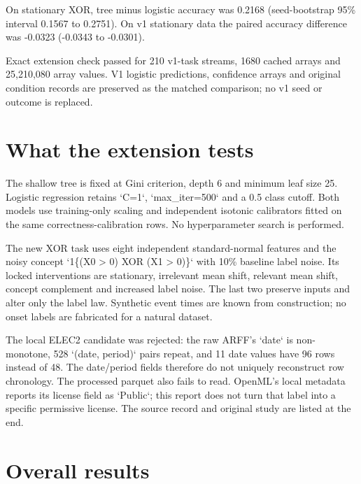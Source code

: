 \documentclass[11pt,a4paper]{article}
\begin{document}
On stationary XOR, tree minus logistic accuracy was 0.2168 (seed-bootstrap 95\% interval 0.1567 to 0.2751). On v1 stationary data the paired accuracy difference was -0.0323 (-0.0343 to -0.0301).\par

Exact extension check passed for 210 v1-task streams, 1680 cached arrays and 25,210,080 array values. V1 logistic predictions, confidence arrays and original condition records are preserved as the matched comparison; no v1 seed or outcome is replaced.\par

\section{What the extension tests}

The shallow tree is fixed at Gini criterion, depth 6 and minimum leaf size 25. Logistic regression retains `C=1`, `max\_iter=500` and a 0.5 class cutoff. Both models use training-only scaling and independent isotonic calibrators fitted on the same correctness-calibration rows. No hyperparameter search is performed.\par

The new XOR task uses eight independent standard-normal features and the noisy concept `1\{(X0 > 0) XOR (X1 > 0)\}` with 10\% baseline label noise. Its locked interventions are stationary, irrelevant mean shift, relevant mean shift, concept complement and increased label noise. The last two preserve inputs and alter only the label law. Synthetic event times are known from construction; no onset labels are fabricated for a natural dataset.\par

The local ELEC2 candidate was rejected: the raw ARFF’s `date` is non-monotone, 528 `(date, period)` pairs repeat, and 11 date values have 96 rows instead of 48. The date/period fields therefore do not uniquely reconstruct row chronology. The processed parquet also fails to read. OpenML’s local metadata reports its license field as `Public`; this report does not turn that label into a specific permissive license. The source record and original study are listed at the end.\par

\section{Overall results}
\end{document}
